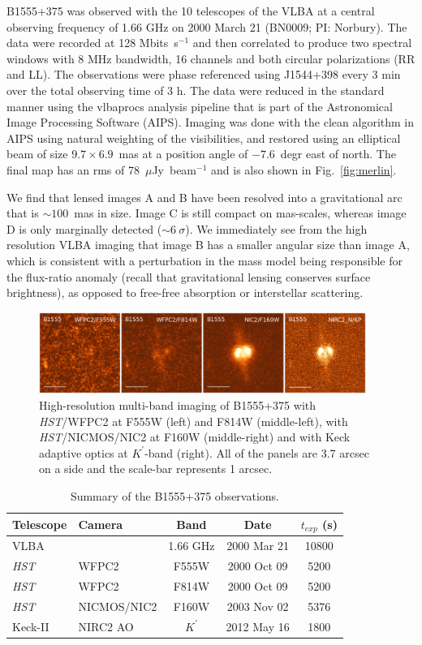 \documentclass[a4paper,fleqn,usenatbib,useAMS]{mnras}
\begin{document}
B1555+375 was observed with the 10 telescopes of the VLBA at a central observing frequency of 1.66 GHz on 2000 March 21 (BN0009; PI: Norbury). The data were recorded at 128 Mbits~s$^{-1}$ and then correlated to produce two spectral windows with 8 MHz bandwidth, 16 channels and both circular polarizations (RR and LL). The observations were phase referenced using J1544+398 every 3 min over the total observing time of 3 h. The data were reduced in the standard manner using the {\sc vlbaprocs} analysis pipeline that is part of the Astronomical Image Processing Software (AIPS). Imaging was done with the {\sc clean} algorithm in AIPS using natural weighting of the visibilities, and restored using an elliptical beam of size $9.7 \times 6.9$~mas at a position angle of $-7.6$~degr east of north. The final map has an rms of 78~$\mu$Jy~beam$^{-1}$ and is also shown in Fig.~\ref{fig:merlin}. 

We find that lensed images A and B have been resolved into a gravitational arc that is $\sim100$~mas in size. Image C is still compact on mas-scales, whereas image D is only marginally detected ($\sim6~\sigma$). We immediately see from the high resolution VLBA imaging that image B has a smaller angular size than image A, which is consistent with a perturbation in the mass model being responsible for the flux-ratio anomaly (recall that gravitational lensing conserves surface brightness), as opposed to free-free absorption or interstellar scattering.

\begin{figure}
\includegraphics[width=0.95\textwidth]{B1555_gallery.eps}
\caption{High-resolution multi-band imaging of B1555+375 with {\it HST}/WFPC2 at F555W (left) and F814W (middle-left), with {\it HST}/NICMOS/NIC2 at F160W (middle-right) and with Keck adaptive optics at $K^\prime$-band (right). All of the panels are 3.7 arcsec on a side and the scale-bar represents 1 arcsec.}
\label{fig:multiband}
\end{figure}

\begin{table}
\centering
\caption{Summary of the B1555+375 observations.}
\begin{tabular}{llccc}
\hline
Telescope		& Camera			&  Band 		& Date				&$t_{exp}$ (s) \\
\hline
VLBA			&					& 1.66 GHz	& 	2000 Mar 21	& 10800\\
\textit{HST}	& WFPC2    		& F555W		&	2000 Oct 09	& 5200\\
\textit{HST}	& WFPC2    		& F814W		&	2000 Oct 09 	& 5200\\
\textit{HST}	& NICMOS/NIC2	& F160W		&	2003 Nov 02	& 5376\\
Keck-II			& NIRC2 AO		& $K^\prime$	& 	2012 May 16	& 1800\\
\hline
\end{tabular}
\label{tab:obs}
\end{table}
\end{document}
